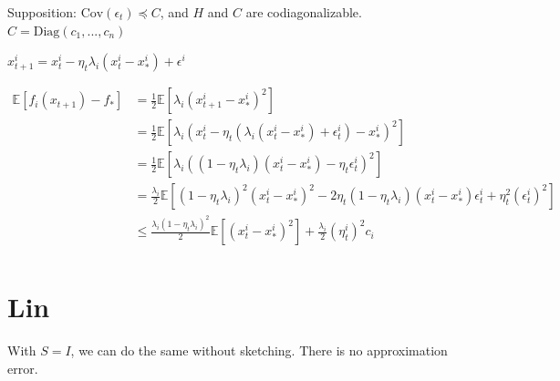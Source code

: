 \documentclass{article}
\newcommand{\cov}{\mathrm{Cov}}
\newcommand{\diag}{\mathrm{Diag}}
\newcommand{\E}{\mathbb{E}}
\begin{document}
Supposition: $\cov(\epsilon_t) \preceq C$, and $H$ and $C$ are codiagonalizable. $C = \diag(c_1,...,c_n)$

$x_{t+1}^{i} = x_t^i - \eta_t\lambda_i(x_t^i - x_*^i) + \epsilon^i$

\begin{align*}
\E [f_i(x_{t+1})-f_*] &= \frac{1}{2}\E [\lambda_i (x_{t+1}^i - x_*^i)^2]\\
&= \frac{1}{2}\E [\lambda_i (x_{t}^i - \eta_t(\lambda_i(x_t^i - x_*^i) + \epsilon_t^i) - x_*^i)^2]\\
&= \frac{1}{2}\E [\lambda_i ((1- \eta_t \lambda_i)(x_t^i - x_*^i) -\eta_t \epsilon_t ^i)^2]\\
&= \frac{\lambda_i}{2}\E [(1-\eta_t\lambda_i)^2(x_{t}^i - x_*^i)^2 - 2\eta_t (1-\eta_t\lambda_i)(x_t^i-x_*^i)\epsilon^i_t + \eta_t^2(\epsilon_t^i)^2]\\
&\leq\frac{\lambda_i(1-\eta_t\lambda_i)^2}{2} \E[(x_t^i - x_*^i)^2]  + \frac{\lambda_i}{2} (\eta_t^i)^2c_i\\ 
\end{align*}


\section{Lin}

With $S = I$, we can do the same without sketching. There is no approximation error.
\end{document}
